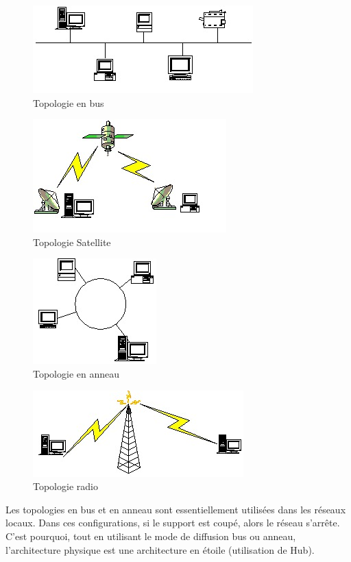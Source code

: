 \begin{figure}[H]
	\centering
	\includegraphics{partie1/topobus.jpg}
	\caption{Topologie en bus}
\end{figure}


\begin{figure}[H]
	\centering
	\includegraphics{partie1/toposat.jpg}
	\caption{Topologie Satellite}
\end{figure}

\begin{figure}[H]
	\centering
	\includegraphics{partie1/toporing.jpg}
	\caption{Topologie en anneau}
\end{figure}

\begin{figure}[H]
	\centering
	\includegraphics{partie1/toporadio.jpg}
	\caption{Topologie radio}
\end{figure}
Les topologies en bus et en anneau sont essentiellement utilisées dans les réseaux locaux. Dans ces configurations, si le support est coupé, alors le réseau s'arrête. C'est pourquoi, tout en utilisant le mode de diffusion bus ou anneau, l'architecture physique est une architecture en étoile (utilisation de Hub).


